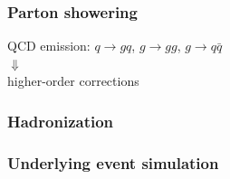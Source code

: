 \begin{frame}\frametitle{Parton showering}
\centering\myskip

\vspace{.4\paperheight}


QCD emission: $q\to gq$, $g\to gg$, $g\to q\bar{q}$\\
{\LARGE $\Downarrow$}\\
higher-order corrections 


\end{frame}

\begin{frame}\frametitle{Hadronization}
\centering\myskip


\vspace{.4\paperheight}


\end{frame}


\begin{frame}\frametitle{Underlying event simulation}
\centering\myskip


\vspace{.4\paperheight}


\end{frame}


